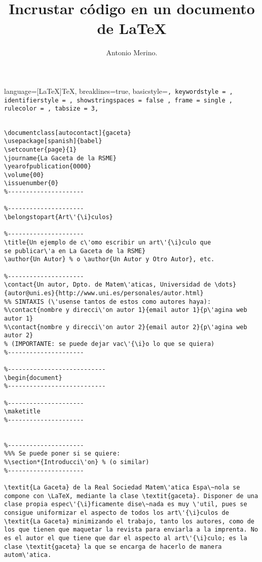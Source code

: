 \documentclass[11pt, a4paper]{article}
\title{Incrustar código en un documento de \LaTeX \\}
\author{Antonio Merino.}
\begin{document}
\maketitle
\lstset
{
language=[LaTeX]TeX,
breaklines=true,
basicstyle=\tt\footnotesize ,
keywordstyle = \color{db!90},
identifierstyle = \color{dh!80},
showstringspaces = false ,
frame = single ,
rulecolor = \color{black!20},
tabsize = 3,
}

\begin{lstlisting}

\documentclass[autocontact]{gaceta}
\usepackage[spanish]{babel}
\setcounter{page}{1} 
\journame{La Gaceta de la RSME}
\yearofpublication{0000}
\volume{00}
\issuenumber{0}
%---------------------

%---------------------
\belongstopart{Art\'{\i}culos} 

%---------------------
\title{Un ejemplo de c\'omo escribir un art\'{\i}culo que 
se publicar\'a en La Gaceta de la RSME}
\author{Un Autor} % o \author{Un Autor y Otro Autor}, etc.

%---------------------
\contact{Un autor, Dpto. de Matem\'aticas, Universidad de \dots}
{autor@uni.es}{http://www.uni.es/personales/autor.html}
%% SINTAXIS (\'usense tantos de estos como autores haya):
%\contact{nombre y direcci\'on autor 1}{email autor 1}{p\'agina web autor 1}
%\contact{nombre y direcci\'on autor 2}{email autor 2}{p\'agina web autor 2}
% (IMPORTANTE: se puede dejar vac\'{\i}o lo que se quiera)
%---------------------

%---------------------------
\begin{document}
%---------------------------

%---------------------
\maketitle
%---------------------


%---------------------
%%% Se puede poner si se quiere:
%\section*{Introducci\'on} % (o similar)
%---------------------

\textit{La Gaceta} de la Real Sociedad Matem\'atica Espa\~nola se compone con \LaTeX, mediante la clase \textit{gaceta}. Disponer de una clase propia espec\'{\i}ficamente dise\~nada es muy \'util, pues se consigue uniformizar el aspecto de todos los art\'{\i}culos de \textit{La Gaceta} minimizando el trabajo, tanto los autores, como de los que tienen que maquetar la revista para enviarla a la imprenta. No es el autor el que tiene que dar el aspecto al art\'{\i}culo; es la clase \textit{gaceta} la que se encarga de hacerlo de manera autom\'atica.


\end{lstlisting}
\end{document}
